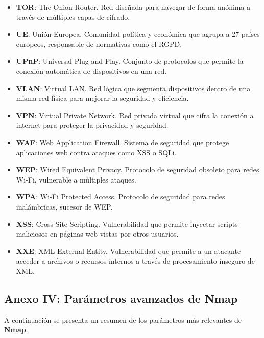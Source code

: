 \documentclass[a4paper, 11pt]{article}
\begin{document}
\begin{itemize}
    \item \textbf{TOR}: The Onion Router. Red diseñada para navegar de forma anónima a través de múltiples capas de cifrado.

    \item \textbf{UE}: Unión Europea. Comunidad política y económica que agrupa a 27 países europeos, responsable de normativas como el RGPD.

    \item \textbf{UPnP}: Universal Plug and Play. Conjunto de protocolos que permite la conexión automática de dispositivos en una red.

    \item \textbf{VLAN}: Virtual LAN. Red lógica que segmenta dispositivos dentro de una misma red física para mejorar la seguridad y eficiencia.

    \item \textbf{VPN}: Virtual Private Network. Red privada virtual que cifra la conexión a internet para proteger la privacidad y seguridad.

    \item \textbf{WAF}: Web Application Firewall. Sistema de seguridad que protege aplicaciones web contra ataques como XSS o SQLi.

    \item \textbf{WEP}: Wired Equivalent Privacy. Protocolo de seguridad obsoleto para redes Wi-Fi, vulnerable a múltiples ataques.

    \item \textbf{WPA}: Wi-Fi Protected Access. Protocolo de seguridad para redes inalámbricas, sucesor de WEP.

    \item \textbf{XSS}: Cross-Site Scripting. Vulnerabilidad que permite inyectar scripts maliciosos en páginas web vistas por otros usuarios.

    \item \textbf{XXE}: XML External Entity. Vulnerabilidad que permite a un atacante acceder a archivos o recursos internos a través de procesamiento inseguro de XML.
\end{itemize}

\clearpage

\subsection{Anexo IV: Parámetros avanzados de Nmap}

A continuación se presenta un resumen de los parámetros más relevantes de \textbf{Nmap}.
\end{document}
